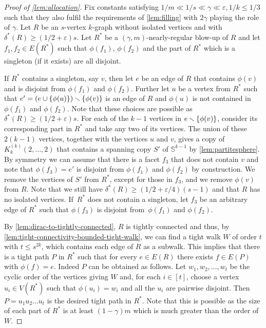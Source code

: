 \documentclass[12pt,reqno]{amsart}
\theoremstyle{plain}
\theoremstyle{definition}
\numberwithin{equation}{section}
\DeclarePairedDelimiter{\set}{\{}{\}}
\renewcommand{\ge}{\geqslant}
\renewcommand{\le}{\leqslant}
\renewcommand{\geq}{\geqslant}
\renewcommand{\setminus}{\smallsetminus}
\newcommand{\eps}{\varepsilon}
\newcommand{\comin}{\delta^{\ast}}
\newcommand{\bS}{\mathbb{S}}
\begin{document}
	\begin{proof}[Proof of \cref{lem:allocation}]
		Fix constants satisfying $1/m \ll 1/s \ll \gamma \ll \eps,1/k \le 1/3$ such that they also fulfil the requirements of \cref{lem:filling} with $2\gamma$ playing the role of $\gamma$.
		Let $R$ be an $s$-vertex $k$-graph without isolated vertices and with $\comin(R) \ge (1/2+\eps)s$.
		Let $R^\ast$ be a $(\gamma, m)$-nearly-regular blow-up of $R$ and let $f_1,f_2\in E(R^\ast)$ such that $\phi(f_1)$, $\phi(f_2)$ and the part of $R^\ast$ which is a singleton (if it exists) are all disjoint.
		
		If $R^\ast$ contains a singleton, say $v$, then let $e$ be an edge of $R$ that contains $\phi(v)$ and is disjoint from $\phi(f_1)$ and $\phi(f_2)$.
		Further let $u$ be a vertex from $R^\ast$ such that $e'=(e \cup \set{ \phi(u) }) \setminus \set{\phi(v) }$ is an edge of $R$ and $\phi(u)$ is not contained in $\phi(f_1)$ and $\phi(f_2)$.
		Note that these choices are possible as $\comin(R) \geq (1/2 + \eps) s$.
		For each of the $k - 1$ vertices in {$e \setminus \set{\phi(v) }$}, consider its corresponding part in $R^\ast$ and take any two of its vertices.
		The union of these $2(k - 1)$ vertices, together with the vertices $u$ and $v$, gives a copy of $K_{k}^{(k)}(2,\dots,2)$ that contains a spanning copy $S'$ of $\bS^{k - 1}$ by \cref{lem:partitesphere}.
		By symmetry we can assume that there is a facet $f_3$ that does not contain $v$ and note that $\phi(f_3) = e'$ is disjoint from $\phi(f_1)$ and $\phi(f_2)$ by construction.
		We remove the vertices of $S'$ from $R^\ast$, except for those in $f_3$, and we remove $\phi(v)$ from $R$.
		Note that we still have $\comin(R) \geq (1/2 + \eps/4) (s-1)$ and that $R$ has no isolated vertices.
		If~$R^\ast$ does not contain a singleton, let $f_3$ be an arbitrary edge of $R^\ast$ such that $\phi(f_3)$ is disjoint from~$\phi(f_1)$ and $\phi(f_2)$.
		
		By \cref{lem:dirac-to-tightly-connected}, $R$ is tightly connected and thus, by \cref{lem:tight-connectivity-bounded-tight-walk}, we can find a tight walk $W$ of order $t$ with $t \le s^{2k}$, which contains each edge of $R$ as a subwalk.
		This implies that there is a tight path $P$ in $R^\ast$ such that for every $e \in E(R)$ there exists $f \in E(P)$ with $\phi(f) = e$.
		Indeed $P$ can be obtained as follows.
		Let $w_1, w_2, \dotsc, w_t$ be the cyclic order of the vertices giving $W$ and, for each $i \in [t]$, choose a  vertex $u_i \in V(R^\ast)$ such that $\phi(u_i)=w_i$ and all the $u_i$ are pairwise disjoint.
		Then $P=u_1 u_2 \dotsc u_t$ is the desired tight path in $R^\ast$.
		Note that this is possible as the size of each part of $R^\ast$ is at least $(1-\gamma)m$ which is much greater than the order of $W$.
		

\end{proof}
\end{document}

